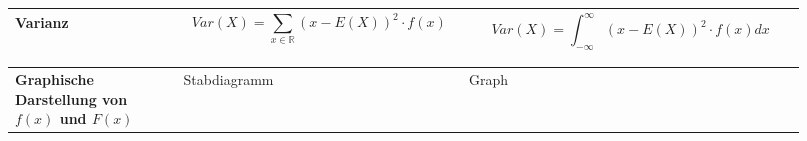 \documentclass[10pt,a4paper,landscape]{article}
\begin{document}
\begin{multicols}{2}
{\begin{tabular}{|>{\centering\arraybackslash}m{0.2\linewidth}
					 |>{\centering\arraybackslash}m{0.32\linewidth}
					 |>{\centering\arraybackslash}m{0.4\linewidth}|}
					 \hline
					 \textbf{Varianz}                                                      &
					 \begin{equation*}
						 Var(X) = \sum_{x \in \mathbb{R}} (x - E(X))^2 \cdot f(x)
					 \end{equation*} \  &
					 \begin{equation*}
						 Var(X) = \int_{-\infty}^{\infty} (x - E(X))^2 \cdot f(x) dx
					 \end{equation*}                                                                                                                                                                                      \\
					 \hline
					 \textbf{Graphische Darstellung von $f(x)$ und $F(x)$}                 & Stabdiagramm                                & Graph                                                                                                                     \\
					 \hline
				 \end{tabular}
			 }
	\end{multicols}

	\pagebreak
\end{document}
